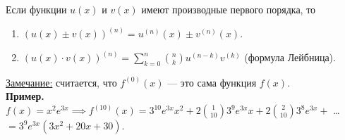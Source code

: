 \documentclass{article}
\begin{document}
\begin{claim}
    Если функции \(u(x)\) и \(v(x)\) имеют производные первого порядка, то 
    \begin{enumerate}
        \item \(\left(u(x) \pm v(x)\right)^{(n)} = u^{(n)}(x) \pm v^{(n)}(x)\).
        \item \(\displaystyle \left(u(x) \cdot v(x)\right)^{(n)} = \sum\limits_{k = 0}^{n} \binom{n}{k} u^{(n - k)} v^{(k)}\) (формула Лейбница).
    \end{enumerate}   
\end{claim}
\noindent \underline{Замечание:} считается, что \(f^{(0)}(x)\) --- это сама функция \(f(x)\).\\[0.15cm]
\noindent \textbf{Пример.} \(\displaystyle f(x) = x^2 e^{3x} \implies f^{(10)}(x) = 3^{10}e^{3x}x^2 + 2\binom{1}{10} 3^9 e^{3x} x + 2\binom{2}{10} 3^8 e^{3x} +\) \dots \(= 3^9 e^{3x} (3x^2 + 20x + 30)\).  
\end{document}
